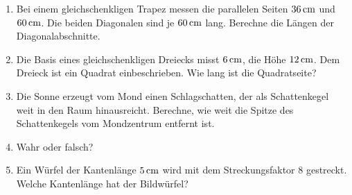 \documentclass[%
11pt,%
twoside,%
titlepage,%
german,%
headsepline%
]{scrartcl}
\begin{document}
\begin{enumerate}
\item Bei einem gleichschenkligen Trapez messen die parallelen Seiten $\unit[36]{cm}$ und $\unit[60]{cm}$. Die beiden Diagonalen sind je $\unit[60]{cm}$ lang. Berechne die L\"angen der Diagonalabschnitte.
\item Die Basis eines gleichschenkligen Dreiecks misst $\unit[6]{cm}$, die H\"ohe $\unit[12]{cm}$. Dem Dreieck ist ein Quadrat einbeschrieben. Wie lang ist die Quadratseite?
\item Die Sonne erzeugt vom Mond einen Schlagschatten, der als Schattenkegel weit in den Raum hinausreicht. Berechne, wie weit die Spitze des Schattenkegels vom Mondzentrum entfernt ist.

\item Wahr oder falsch?
\item Ein W\"urfel der Kantenl\"ange $\unit[5]{cm}$ wird mit dem Streckungsfaktor $8$ gestreckt. Welche Kantenl\"ange hat der Bildw\"urfel?


\end{enumerate}
\end{document}
